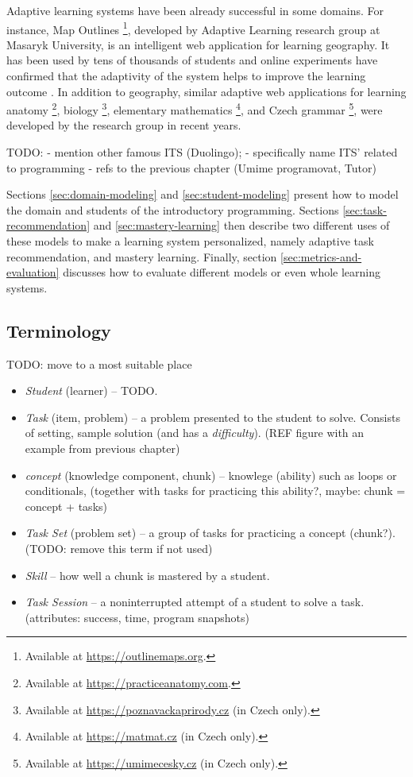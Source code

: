 Adaptive learning systems have been already successful in some domains.
For instance, Map Outlines%
  \footnote{Available at \url{https://outlinemaps.org}.},
  developed by Adaptive Learning research group at Masaryk University,
  is an intelligent web application for learning geography.
It has been used by tens of thousands of students
  and online experiments have confirmed
  that the adaptivity of the system helps to improve the learning outcome
  \cite{alg.evaluation-geography}.
In addition to geography, similar adaptive web applications
  for learning anatomy%
  \footnote{Available at \url{https://practiceanatomy.com}.},
  biology%
  \footnote{Available at \url{https://poznavackaprirody.cz} (in Czech only).},
  elementary mathematics%
  \footnote{Available at \url{https://matmat.cz} (in Czech only).},
  and Czech grammar%
  \footnote{Available at \url{https://umimecesky.cz} (in Czech only).},
  were developed by the research group in recent years.

TODO:
- mention other famous ITS (Duolingo);
- specifically name ITS' related to programming - refs to the previous
chapter (Umime programovat, Tutor)


Sections \ref{sec:domain-modeling} and \ref{sec:student-modeling} present how
to model the domain and students of the introductory programming.
Sections \ref{sec:task-recommendation} and \ref{sec:mastery-learning}
then describe two different uses of these models to make a learning system
personalized, namely adaptive task recommendation, and mastery learning.
Finally, section \ref{sec:metrics-and-evaluation} discusses how to evaluate
different models or even whole learning systems.

\subsection{Terminology}

TODO: move to a most suitable place

\begin{itemize}
\item \emph{Student} (learner) -- TODO.
\item \emph{Task} (item, problem)
  -- a problem presented to the student to solve.
  Consists of setting, sample solution (and has a \emph{difficulty}).
  (REF figure with an example from previous chapter)
\item \emph{concept} (knowledge component, chunk)
  -- knowlege (ability) such as loops or conditionals,
  (together with tasks for practicing this ability?,
   maybe: chunk = concept + tasks)
\item \emph{Task Set} (problem set)
  -- a group of tasks for practicing a concept (chunk?).
  (TODO: remove this term if not used)
\item \emph{Skill}
  -- how well a chunk is mastered by a student.
\item \emph{Task Session}
  -- a noninterrupted attempt of a student to solve a task.
  (attributes: success, time, program snapshots)
\end{itemize}

